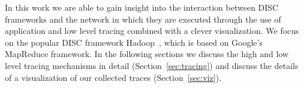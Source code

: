 In this work we are able to gain insight into the interaction between DISC 
frameworks and the network in which they are executed through the use of
application and low level tracing combined with a clever visualization. We 
focus on the popular DISC framework Hadoop~\cite{ApacheHadoop}, which is based on 
Google's MapReduce framework. In the following sections we discuss the high 
and low level tracing mechanisms in detail (Section~\ref{sec:tracing}) and 
discuss the details of a visualization of our collected traces (Section~\ref{sec:viz}).
